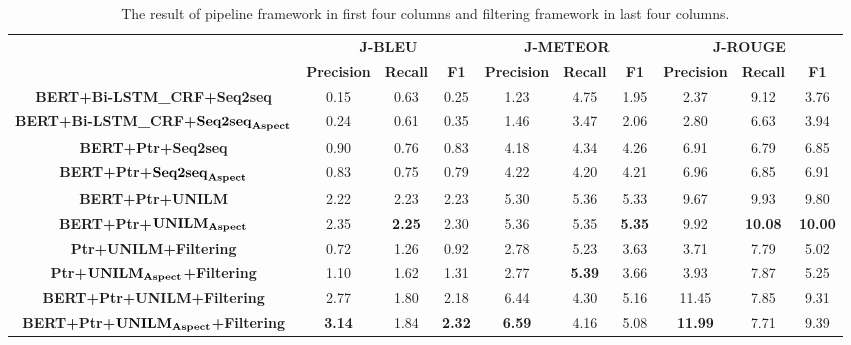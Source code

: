 \begin{table*}[th]
\small
\centering
\begin{tabular}{cccccccccc}
\hline
 & \multicolumn{3}{c}{\textbf{J-BLEU}} & \multicolumn{3}{c}{\textbf{J-METEOR}} & \multicolumn{3}{c}{\textbf{J-ROUGE}} \\ 
 & \textbf{Precision} & \textbf{Recall} & \textbf{F1} & \textbf{Precision} & \textbf{Recall} & \textbf{F1} & \textbf{Precision} & \textbf{Recall} & \textbf{F1} \\ \hline\hline
 \textbf{BERT+Bi-LSTM\_CRF+Seq2seq} & 0.15 &  0.63  & 0.25  & 1.23  & 4.75  & 1.95 & 2.37 &  9.12  & 3.76\\
 \textbf{BERT+Bi-LSTM\_CRF+}$\text{\textbf{Seq2seq}}_{\text{\textbf{Aspect}}}$ & 0.24 &  0.61 &   0.35 &  1.46 &  3.47  & 2.06 &  2.80  & 6.63  & 3.94\\
\textbf{BERT+Ptr+Seq2seq} & 0.90  &  0.76  &  0.83  &  4.18  & 4.34  & 4.26 &  6.91  &  6.79   & 6.85  \\ 
\textbf{BERT+Ptr+}$\text{\textbf{Seq2seq}}_{\text{\textbf{Aspect}}}$  & 0.83  &  0.75  &  0.79  &  4.22  & 4.20  & 4.21 &  6.96  &  6.85  &  6.91  \\ 
\textbf{BERT+Ptr+UNILM} & 2.22 & 2.23  &  2.23  &  5.30 & 5.36  & 5.33 &  9.67 &   9.93  &  9.80  \\ 
\textbf{BERT+Ptr+}$\text{\textbf{UNILM}}_{\text{\textbf{Aspect}}}$ & 2.35  & \textbf{2.25}   & 2.30   & 5.36  & 5.35 & \textbf{5.35} &  9.92 &   \textbf{10.08} &  \textbf{10.00}  \\ \hline
\textbf{Ptr+UNILM+Filtering} & 0.72   &  1.26  &  0.92   & 2.78 &  5.23  & 3.63  & 3.71 &   7.79  &  5.02  \\ 
\textbf{Ptr+}$\text{\textbf{UNILM}}_{\text{\textbf{Aspect}}}$\textbf{+Filtering}& 1.10 & 1.62  &  1.31   & 2.77  &  \textbf{5.39} &  3.66 &  3.93  &  7.87   & 5.25  \\ \hline
\textbf{BERT+Ptr+UNILM+Filtering} & 2.77  &  1.80   & 2.18  &  6.44  & 4.30  & 5.16  & 11.45  & 7.85   & 9.31  \\ 
\textbf{BERT+Ptr+}$\text{\textbf{UNILM}}_{\text{\textbf{Aspect}}}$\textbf{+Filtering} & \textbf{3.14}  &  1.84  &  \textbf{2.32}  &  \textbf{6.59} &  4.16 &  5.08 &  \textbf{11.99}  & 7.71  &  9.39  \\ \hline
\end{tabular}
\caption{\label{tab:allres} The result of pipeline framework in first four columns and filtering framework in last four columns.}
\end{table*}